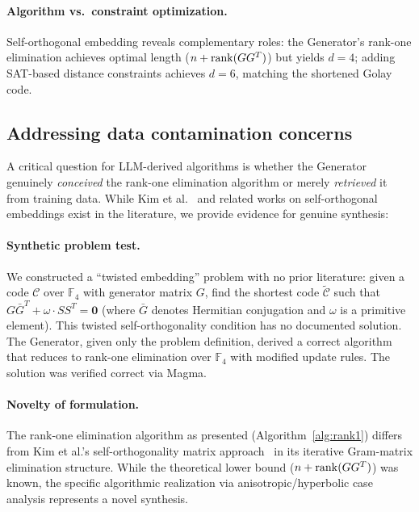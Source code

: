 \paragraph{Algorithm vs.\ constraint optimization.} Self-orthogonal embedding reveals complementary roles: the Generator's rank-one elimination achieves optimal length ($n + \mathrm{rank}(GG^T)$) but yields $d=4$; adding SAT-based distance constraints achieves $d=6$, matching the shortened Golay code.

\subsection{Addressing data contamination concerns}\label{sec:contamination}

A critical question for LLM-derived algorithms is whether the Generator genuinely \textit{conceived} the rank-one elimination algorithm or merely \textit{retrieved} it from training data. While Kim et al.~\cite{Kim2021} and related works on self-orthogonal embeddings exist in the literature, we provide evidence for genuine synthesis:

\paragraph{Synthetic problem test.} We constructed a ``twisted embedding'' problem with no prior literature: given a code $\mathcal{C}$ over $\mathbb{F}_4$ with generator matrix $G$, find the shortest code $\tilde{\mathcal{C}}$ such that $G\bar{G}^T + \omega \cdot SS^T = \mathbf{0}$ (where $\bar{G}$ denotes Hermitian conjugation and $\omega$ is a primitive element). This twisted self-orthogonality condition has no documented solution. The Generator, given only the problem definition, derived a correct algorithm that reduces to rank-one elimination over $\mathbb{F}_4$ with modified update rules. The solution was verified correct via Magma.

\paragraph{Novelty of formulation.} The rank-one elimination algorithm as presented (Algorithm~\ref{alg:rank1}) differs from Kim et al.'s self-orthogonality matrix approach~\cite{Kim2022} in its iterative Gram-matrix elimination structure. While the theoretical lower bound ($n + \mathrm{rank}(GG^T)$) was known, the specific algorithmic realization via anisotropic/hyperbolic case analysis represents a novel synthesis.

